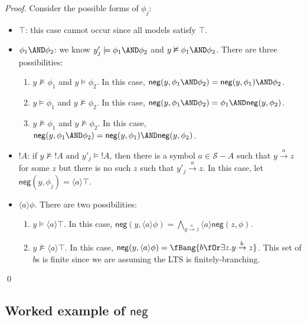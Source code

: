 \begin{proof}
Consider the possible forms of $\phi_j$:
\begin{itemize}
\item
$\top$: this case cannot occur since all models satisfy $\top$.
\item
$\phi_1 \AND \phi_2$: we know $y'_j \models \phi_1 \AND \phi_2$ and $y \nvDash \phi_1 \AND \phi_2$. There are three possibilities:
\begin{enumerate}
\item
$y \nvDash \phi_1$ and $y \models \phi_2$. In this case, $\mathsf{neg}(y, \phi_1 \AND \phi_2) = \mathsf{neg}(y, \phi_1) \AND \phi_2$.
\item
$y \models \phi_1$ and $y \nvDash \phi_2$. In this case, $\mathsf{neg}(y, \phi_1 \AND \phi_2) = \phi_1 \AND \mathsf{neg}(y, \phi_2)$.
\item
$y \nvDash \phi_1$ and $y \nvDash \phi_2$. In this case, $\mathsf{neg}(y, \phi_1 \AND \phi_2) =  \mathsf{neg}(y, \phi_1) \AND \mathsf{neg}(y, \phi_2)$.
\end{enumerate}
\item
$!A$: if $y \nvDash !A \mbox{ and } y'_j \models !A$, then there is a symbol $a \in \mathcal{S}-A$ such that $y \xrightarrow{a} z$ for some $z$ but there is no such $z$ such that $y'_j \xrightarrow{a} z$. In this case, let $\mathsf{neg}(y, \phi_j) = \langle a \rangle \top$.
\item
$\langle a \rangle \phi$. There are two possibilities:
\begin{enumerate}
\item
$y \models \langle a \rangle \top$. In this case, $\mathsf{neg}(y, \langle a \rangle \phi) =  \bigwedge\limits_{y \xrightarrow{a} z}  \langle a \rangle \mathsf{neg}(z, \phi)$.
\item
$y \nvDash \langle a \rangle \top$. In this case, $\mathsf{neg}(y, \langle a \rangle \phi) = \fBang \{ b \fOr \exists z. y \xrightarrow{b} z\}$. This set of $b$s is finite since we are assuming the LTS is finitely-branching.
\end{enumerate}
\end{itemize}
\qed
\end{proof}

\subsection{Worked example of $\mathsf{neg}$}




